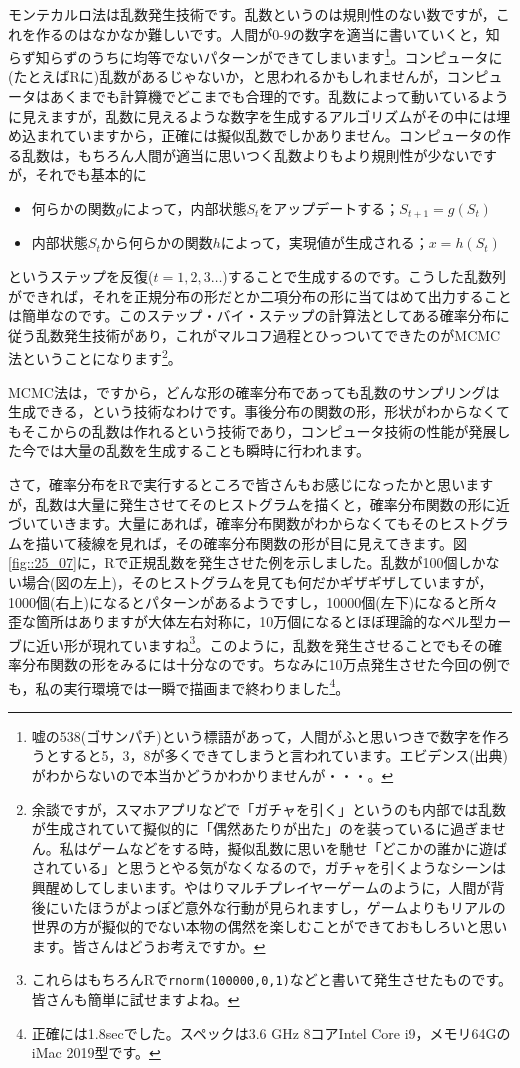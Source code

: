 \documentclass{ltjsarticle}
\begin{document}
モンテカルロ法は乱数発生技術です。乱数というのは規則性のない数ですが，これを作るのはなかなか難しいです。人間が0-9の数字を適当に書いていくと，知らず知らずのうちに均等でないパターンができてしまいます\footnote{嘘の538(ゴサンパチ)という標語があって，人間がふと思いつきで数字を作ろうとすると5，3，8が多くできてしまうと言われています。エビデンス(出典)がわからないので本当かどうかわかりませんが・・・。}。コンピュータに(たとえばRに)乱数があるじゃないか，と思われるかもしれませんが，コンピュータはあくまでも計算機でどこまでも合理的です。乱数によって動いているように見えますが，乱数に見えるような数字を生成するアルゴリズムがその中には埋め込まれていますから，正確には擬似乱数でしかありません。コンピュータの作る乱数は，もちろん人間が適当に思いつく乱数よりもより規則性が少ないですが，それでも基本的に
\begin{itemize}
	\item 何らかの関数$g$によって，内部状態$S_t$をアップデートする；$S_{t+1}=g(S_t)$
	\item 内部状態$S_t$から何らかの関数$h$によって，実現値が生成される；$x = h(S_t)$
\end{itemize}
というステップを反復($t=1,2,3\ldots$)することで生成するのです。こうした乱数列ができれば，それを正規分布の形だとか二項分布の形に当てはめて出力することは簡単なのです。このステップ・バイ・ステップの計算法としてある確率分布に従う乱数発生技術があり，これがマルコフ過程とひっついてできたのがMCMC法ということになります\footnote{余談ですが，スマホアプリなどで「ガチャを引く」というのも内部では乱数が生成されていて擬似的に「偶然あたりが出た」のを装っているに過ぎません。私はゲームなどをする時，擬似乱数に思いを馳せ「どこかの誰かに遊ばされている」と思うとやる気がなくなるので，ガチャを引くようなシーンは興醒めしてしまいます。やはりマルチプレイヤーゲームのように，人間が背後にいたほうがよっぽど意外な行動が見られますし，ゲームよりもリアルの世界の方が擬似的でない本物の偶然を楽しむことができておもしろいと思います。皆さんはどうお考えですか。}。

MCMC法は，ですから，どんな形の確率分布であっても乱数のサンプリングは生成できる，という技術なわけです。事後分布の関数の形，形状がわからなくてもそこからの乱数は作れるという技術であり，コンピュータ技術の性能が発展した今では大量の乱数を生成することも瞬時に行われます。

さて，確率分布をRで実行するところで皆さんもお感じになったかと思いますが，乱数は大量に発生させてそのヒストグラムを描くと，確率分布関数の形に近づいていきます。大量にあれば，確率分布関数がわからなくてもそのヒストグラムを描いて稜線を見れば，その確率分布関数の形が目に見えてきます。図\ref{fig::25_07}に，Rで正規乱数を発生させた例を示しました。乱数が100個しかない場合(図の左上)，そのヒストグラムを見ても何だかギザギザしていますが，1000個(右上)になるとパターンがあるようですし，10000個(左下)になると所々歪な箇所はありますが大体左右対称に，10万個になるとほぼ理論的なベル型カーブに近い形が現れていますね\footnote{これらはもちろんRで\texttt{rnorm(100000,0,1)}などと書いて発生させたものです。皆さんも簡単に試せますよね。}。このように，乱数を発生させることでもその確率分布関数の形をみるには十分なのです。ちなみに10万点発生させた今回の例でも，私の実行環境では一瞬で描画まで終わりました\footnote{正確には1.8secでした。スペックは3.6 GHz 8コアIntel Core i9，メモリ64GのiMac 2019型です。}。
\end{document}
